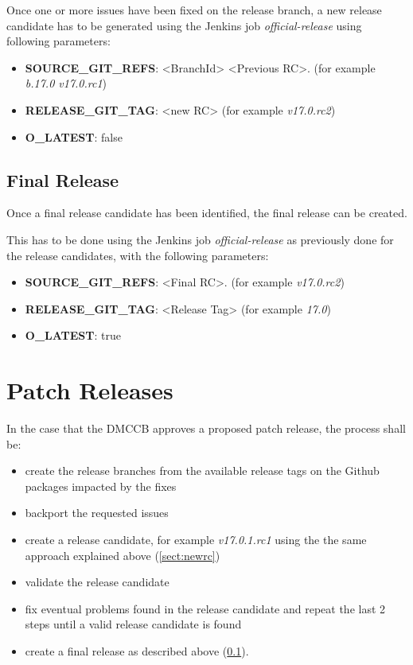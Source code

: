 Once one or more issues have been fixed on the release branch, a new release candidate has to be generated using the Jenkins job \textit{official-release} using following parameters:

\begin{itemize}
\item {\bf SOURCE\_GIT\_REFS}: <BranchId> <Previous RC>. (for example \textit{b.17.0 v17.0.rc1})
\item {\bf RELEASE\_GIT\_TAG}: <new RC> (for example \textit{v17.0.rc2})
\item {\bf O\_LATEST}: false
\end{itemize}

\subsection{Final Release} \label{sect:finalrelease}

Once a final release candidate has been identified, the final release can be created.

This has to be done using the Jenkins job \textit{official-release} as previously done for the release candidates, with the following parameters:

\begin{itemize}
\item {\bf SOURCE\_GIT\_REFS}: <Final RC>. (for example \textit{v17.0.rc2})
\item {\bf RELEASE\_GIT\_TAG}: <Release Tag> (for example \textit{17.0})
\item {\bf O\_LATEST}: true
\end{itemize}

\newpage

\section{Patch Releases} \label{sect:patchreleases}

In the case that the DMCCB approves a proposed patch release, the process shall be:

\begin{itemize}
\item create the release branches from the available release tags on the Github packages impacted by the fixes
\item backport the requested issues
\item create a release candidate, for example \textit{v17.0.1.rc1} using the the same approach explained above (\ref{sect:newrc})
\item validate the release candidate
\item fix eventual problems found in the release candidate and repeat the last 2 steps until a valid release candidate is found
\item create a final release as described above (\ref{sect:finalrelease}).
\end{itemize}


